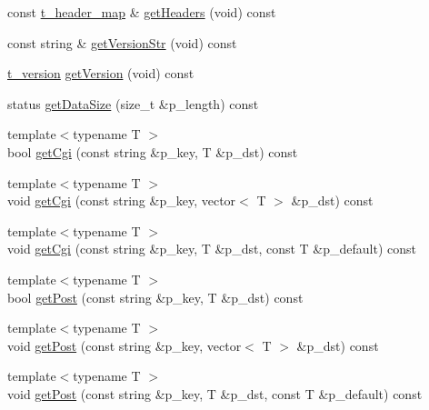 \begin{DoxyCompactItemize}
\item 
const \hyperlink{classxtd_1_1network_1_1http_1_1Request_aeaf2a69c884e81983aebaf36518c310e}{t\-\_\-header\-\_\-map} \& \hyperlink{classxtd_1_1network_1_1http_1_1Request_abbe34833ea46c5a794c7c49796a192c3}{get\-Headers} (void) const 
\item 
const string \& \hyperlink{classxtd_1_1network_1_1http_1_1Request_a609f7328025e89fd8325677212ab307b}{get\-Version\-Str} (void) const 
\item 
\hyperlink{classxtd_1_1network_1_1http_1_1Request_ad1842a3667ff0a96222bb69262cda536}{t\-\_\-version} \hyperlink{classxtd_1_1network_1_1http_1_1Request_acdf8a64d92f997aa7a0eaf7fc07cf897}{get\-Version} (void) const 
\item 
status \hyperlink{classxtd_1_1network_1_1http_1_1Request_a90a878fc6498d5594617329da39d1ac5}{get\-Data\-Size} (size\-\_\-t \&p\-\_\-length) const 
\item 
{\footnotesize template$<$typename T $>$ }\\bool \hyperlink{classxtd_1_1network_1_1http_1_1Request_a7af5942f7505ac377c8017f51b24854e}{get\-Cgi} (const string \&p\-\_\-key, T \&p\-\_\-dst) const 
\item 
{\footnotesize template$<$typename T $>$ }\\void \hyperlink{classxtd_1_1network_1_1http_1_1Request_adc71d7250d7064b513b619091b0a6961}{get\-Cgi} (const string \&p\-\_\-key, vector$<$ T $>$ \&p\-\_\-dst) const 
\item 
{\footnotesize template$<$typename T $>$ }\\void \hyperlink{classxtd_1_1network_1_1http_1_1Request_ad1efea31852175056b036fdd2df71135}{get\-Cgi} (const string \&p\-\_\-key, T \&p\-\_\-dst, const T \&p\-\_\-default) const 
\item 
{\footnotesize template$<$typename T $>$ }\\bool \hyperlink{classxtd_1_1network_1_1http_1_1Request_a052d76c6e9f2d8eede058c7d2fddd9ef}{get\-Post} (const string \&p\-\_\-key, T \&p\-\_\-dst) const 
\item 
{\footnotesize template$<$typename T $>$ }\\void \hyperlink{classxtd_1_1network_1_1http_1_1Request_a073d8eef444c0d981e3bd5137e13de3b}{get\-Post} (const string \&p\-\_\-key, vector$<$ T $>$ \&p\-\_\-dst) const 
\item 
{\footnotesize template$<$typename T $>$ }\\void \hyperlink{classxtd_1_1network_1_1http_1_1Request_ab4b8f57135d2f6d1e622ae5fe81c1ca7}{get\-Post} (const string \&p\-\_\-key, T \&p\-\_\-dst, const T \&p\-\_\-default) const 

\end{DoxyCompactItemize}
